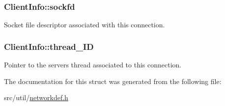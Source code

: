 \subsubsection[{\texorpdfstring{sockfd}{sockfd}}]{\setlength{\rightskip}{0pt plus 5cm}Client\+Info\+::sockfd}\hypertarget{structClientInfo_a2e6d4c5d276144166df3a511592b9c49}{}\label{structClientInfo_a2e6d4c5d276144166df3a511592b9c49}
Socket file descriptor associated with this connection. 
\subsubsection[{\texorpdfstring{thread\+\_\+\+ID}{thread_ID}}]{\setlength{\rightskip}{0pt plus 5cm}Client\+Info\+::thread\+\_\+\+ID}\hypertarget{structClientInfo_a473c67886fcb2ae0b18b04e6890870ba}{}\label{structClientInfo_a473c67886fcb2ae0b18b04e6890870ba}
Pointer to the server\textquotesingle{}s thread associated to this connection. 

The documentation for this struct was generated from the following file\+:\begin{DoxyCompactItemize}
\item 
src/util/\hyperlink{networkdef_8h}{networkdef.\+h}\end{DoxyCompactItemize}
